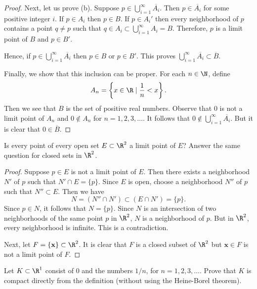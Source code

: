 \begin{proof}
Next, let us prove (b). 
Suppose $p \in \bigcup_{i=1}^{\infty} \overline{A_i}$.
Then $p \in \overline{A_i}$ for some positive integer $i$.
If $p \in A_i$ then $p \in B$.
If $p \in A_i'$ then every neighborhood of $p$ contains a point $q \neq p$ such that $q \in A_i \subset \bigcup_{i=1}^{\infty}A_i=B$.
Therefore, $p$ is a limit point of $B$ and $p \in B'$. 

Hence, if $p \in \bigcup_{i=1}^{\infty} \overline{A_i}$ then $p \in B$ or $p \in B'$. This proves $\bigcup_{i=1}^{\infty}\overline{A_i} \subset \overline{B}$.

Finally, we show that this inclusion can be proper.
For each $n \in \N$, define
\[
A_n=\left\{x \in \R \mid \frac{1}{n}<x \right\}.
\]
Then we see that $B$ is the set of positive real numbers.
Observe that $0$ is not a limit point of $A_n$ and $0 \notin A_n$ for $n=1,2,3, \ldots$.
It follows that $0 \notin \bigcup_{i=1}^{\infty}\overline{A_i}$. But it is clear that $0 \in \overline{B}$.
\end{proof}
\begin{exercise}
Is every point of every open set $E \subset \R^2$ a limit point of $E$?
Answer the same question for closed sets in $\R^2$.
\end{exercise}
\begin{proof}
Suppose $p \in E$ is not a limit point of $E$.
Then there exists a neighborhood $N'$ of $p$ such that $N' \cap E = \{p\}$.
Since $E$ is open, choose a neighborhood $N''$ of $p$ such that $N'' \subset E$.
Then we have 
\[
N= (N'' \cap N') \subset (E \cap N') = \{p\}.
\]
Since $p \in N$, it follows that $N=\{p\}$. Since $N$ is an intersection of two neighborhoods of the same point $p$ in $\R^2$, $N$ is a neighborhood of $p$.
But in $\R^2$, every neighborhood is infinite.
This is a contradiction.

Next, let $F=\{\mathbf{x}\} \subset \R^2$. It is clear that $F$ is a closed subset of $\R^2$ but $\mathbf{x} \in F$ is not a limit point of $F$.
\end{proof}
\begin{exercise}
Let $K \subset \R^1$ consist of $0$ and the numbers $1/n$, for $n=1,2,3,\ldots$. 
Prove that $K$ is compact directly from the definition (without using the Heine-Borel theorem).
\end{exercise}
